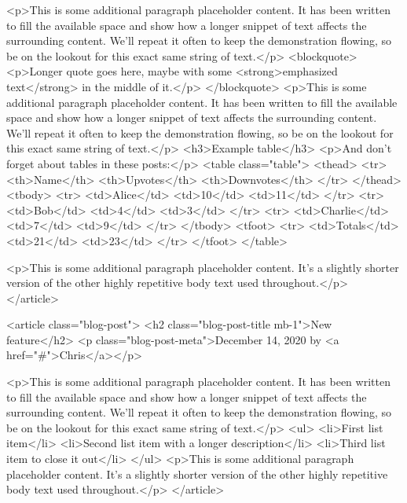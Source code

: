         <p>This is some additional paragraph placeholder content. It has been written to fill the available space and show how a longer snippet of text affects the surrounding content. We'll repeat it often to keep the demonstration flowing, so be on the lookout for this exact same string of text.</p>
        <blockquote>
          <p>Longer quote goes here, maybe with some <strong>emphasized text</strong> in the middle of it.</p>
        </blockquote>
        <p>This is some additional paragraph placeholder content. It has been written to fill the available space and show how a longer snippet of text affects the surrounding content. We'll repeat it often to keep the demonstration flowing, so be on the lookout for this exact same string of text.</p>
        <h3>Example table</h3>
        <p>And don't forget about tables in these posts:</p>
        <table class="table">
          <thead>
            <tr>
              <th>Name</th>
              <th>Upvotes</th>
              <th>Downvotes</th>
            </tr>
          </thead>
          <tbody>
            <tr>
              <td>Alice</td>
              <td>10</td>
              <td>11</td>
            </tr>
            <tr>
              <td>Bob</td>
              <td>4</td>
              <td>3</td>
            </tr>
            <tr>
              <td>Charlie</td>
              <td>7</td>
              <td>9</td>
            </tr>
          </tbody>
          <tfoot>
            <tr>
              <td>Totals</td>
              <td>21</td>
              <td>23</td>
            </tr>
          </tfoot>
        </table>

        <p>This is some additional paragraph placeholder content. It's a slightly shorter version of the other highly repetitive body text used throughout.</p>
      </article>

      <article class="blog-post">
        <h2 class="blog-post-title mb-1">New feature</h2>
        <p class="blog-post-meta">December 14, 2020 by <a href="#">Chris</a></p>

        <p>This is some additional paragraph placeholder content. It has been written to fill the available space and show how a longer snippet of text affects the surrounding content. We'll repeat it often to keep the demonstration flowing, so be on the lookout for this exact same string of text.</p>
        <ul>
          <li>First list item</li>
          <li>Second list item with a longer description</li>
          <li>Third list item to close it out</li>
        </ul>
        <p>This is some additional paragraph placeholder content. It's a slightly shorter version of the other highly repetitive body text used throughout.</p>
      </article>


